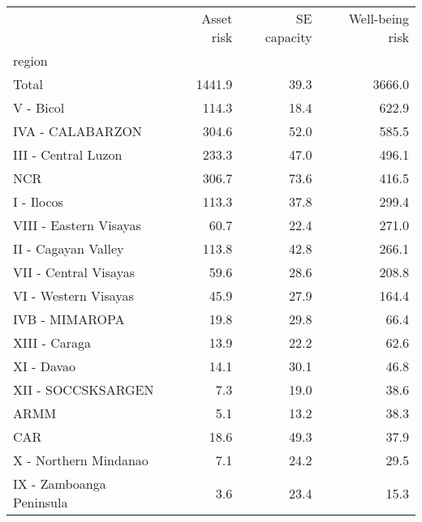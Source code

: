 \begin{tabular}{lrrr}
\toprule
{} &  Asset risk &  SE capacity &  Well-being risk \\
region                   &             &              &                  \\
\midrule
Total                    &      1441.9 &         39.3 &           3666.0 \\
V - Bicol                &       114.3 &         18.4 &            622.9 \\
IVA - CALABARZON         &       304.6 &         52.0 &            585.5 \\
III - Central Luzon      &       233.3 &         47.0 &            496.1 \\
NCR                      &       306.7 &         73.6 &            416.5 \\
I - Ilocos               &       113.3 &         37.8 &            299.4 \\
VIII - Eastern Visayas   &        60.7 &         22.4 &            271.0 \\
II - Cagayan Valley      &       113.8 &         42.8 &            266.1 \\
VII - Central Visayas    &        59.6 &         28.6 &            208.8 \\
VI - Western Visayas     &        45.9 &         27.9 &            164.4 \\
IVB - MIMAROPA           &        19.8 &         29.8 &             66.4 \\
XIII - Caraga            &        13.9 &         22.2 &             62.6 \\
XI - Davao               &        14.1 &         30.1 &             46.8 \\
XII - SOCCSKSARGEN       &         7.3 &         19.0 &             38.6 \\
ARMM                     &         5.1 &         13.2 &             38.3 \\
CAR                      &        18.6 &         49.3 &             37.9 \\
X - Northern Mindanao    &         7.1 &         24.2 &             29.5 \\
IX - Zamboanga Peninsula &         3.6 &         23.4 &             15.3 \\
\bottomrule
\end{tabular}
